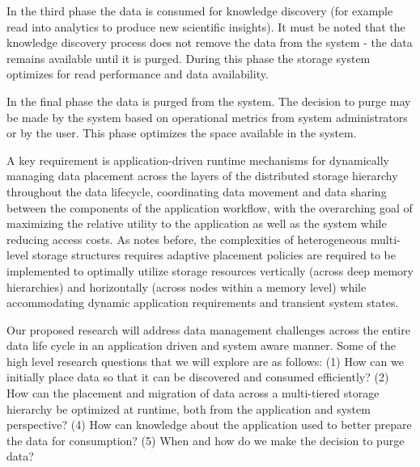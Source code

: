 In the third phase the data is consumed for knowledge discovery (for example
read into analytics to produce new scientific insights). It must be noted
that the knowledge discovery process does not remove the data from the
system - the data remains available until it is purged. During this phase
the storage system optimizes for read performance and data availability. 

In the final phase the data is purged from the system. The
decision to purge may be made by the system based on operational metrics from
system administrators or by the user. This phase optimizes the space available in the
system. %

A key requirement is application-driven runtime mechanisms for dynamically managing 
data placement across the layers of the distributed storage hierarchy throughout the 
data lifecycle, coordinating data movement and data sharing between the components 
of the application workflow, with the overarching goal of maximizing the relative utility 
to the application as well as the system while reducing access costs. As notes before,
the complexities of heterogeneous multi-level storage structures requires adaptive 
placement policies are required to be implemented to optimally utilize storage resources 
vertically (across deep memory hierarchies) and horizontally (across nodes within a 
memory level) while accommodating dynamic application requirements and  transient 
system states. 

Our proposed research will address data management challenges across the entire 
data life cycle in an application driven and system aware manner. 
Some of the high level research questions that we will explore are as follows: 
(1) How can we initially place data so that it can be discovered and consumed efficiently?
(2) How can the placement and migration of data across a multi-tiered storage hierarchy be 
optimized at runtime, both from the application and system perspective?
(4) How can knowledge about the application used to better prepare the data for consumption? 
(5) When and how do we make the decision to purge data?  %

